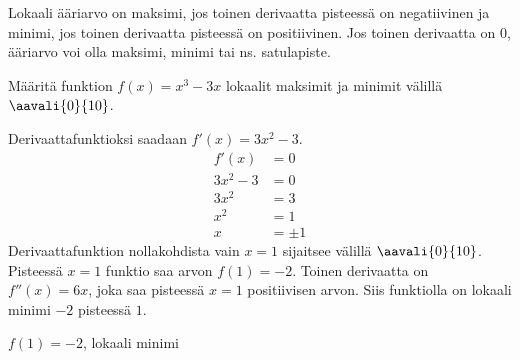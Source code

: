 
Lokaali ääriarvo on maksimi, jos toinen derivaatta pisteessä on negatiivinen ja minimi, jos
toinen derivaatta pisteessä on positiivinen. Jos toinen derivaatta on $0$, ääriarvo voi olla
maksimi, minimi tai ns. satulapiste.

\begin{esimerkki}
	Määritä funktion $f(x)=x^3-3x$ lokaalit maksimit ja minimit välillä $\aavali{0}{10}$.
	\begin{esimratk}
		Derivaattafunktioksi saadaan $f'(x)=3x^2-3$.
		\begin{align*}
			f'(x) &= 0 \\
			3x^2-3 &= 0 \\
			3x^2 &= 3 \\
			x^2 &= 1 \\
			x &= \pm 1
		\end{align*}
		Derivaattafunktion nollakohdista vain $x = 1$ sijaitsee välillä $\aavali{0}{10}$.
		Pisteessä $x = 1$ funktio saa arvon $f(1) = -2$. Toinen derivaatta on $f''(x)=6x$,
		joka saa pisteessä $x = 1$ positiivisen arvon. Siis funktiolla on lokaali minimi $-2$
		pisteessä $1$.
	\end{esimratk}
	\begin{esimvast}
		$f(1) = -2$, lokaali minimi
	\end{esimvast}
\end{esimerkki}

